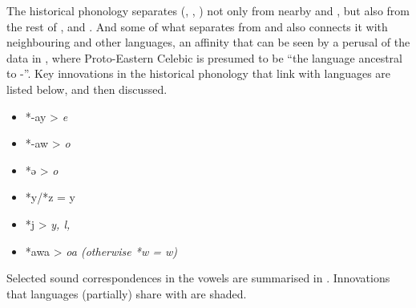 The historical phonology separates  (,
, ) not only from nearby 
and , but also from the rest of ,  and .
And some of what separates  from 
and  also connects it with neighbouring 
and other  languages,
an affinity that can be seen by a perusal of the data in
\citet{Mead2003a,Mead2003b}, where Proto-Eastern Celebic is presumed to be “the
language ancestral to -”.
Key innovations in the historical phonology that link 
with  languages are listed below,
and then discussed.

\begin{itemize}[noitemsep]
	\item	*-ay > \it{e}
	\item	*-aw > \it{o}
	\item	*ə > \it{o}
	\item	*y/*z = y
	\item	*j > \it{y, l}, {\0}
	\item	*awa > \it{oa} (otherwise *w = \it{w})
\end{itemize}

\newpage
Selected sound correspondences in the vowels are summarised in .
Innovations that  languages (partially) share with
 are shaded.

